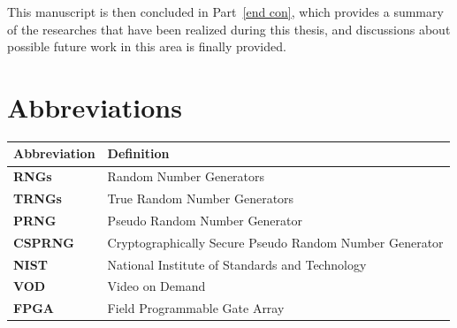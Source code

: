This manuscript is then concluded in Part~\ref{end con}, which provides a summary of the researches that have been realized
during this thesis, and discussions about possible future work in this area is finally provided.

\section{Abbreviations}
\begin{tabular}{ll}\toprule
\textbf{Abbreviation}& \textbf{Definition}\\\hline
\textbf{RNGs}& Random Number Generators\\
\textbf{TRNGs}& True Random Number Generators\\
\textbf{PRNG}& Pseudo Random Number Generator\\
\textbf{CSPRNG}& Cryptographically Secure Pseudo Random Number Generator\\
\textbf{NIST}& National Institute of Standards and Technology\\
\textbf{VOD}&Video on Demand\\
\textbf{FPGA}& Field Programmable Gate Array\\ \bottomrule
\end{tabular}
 

